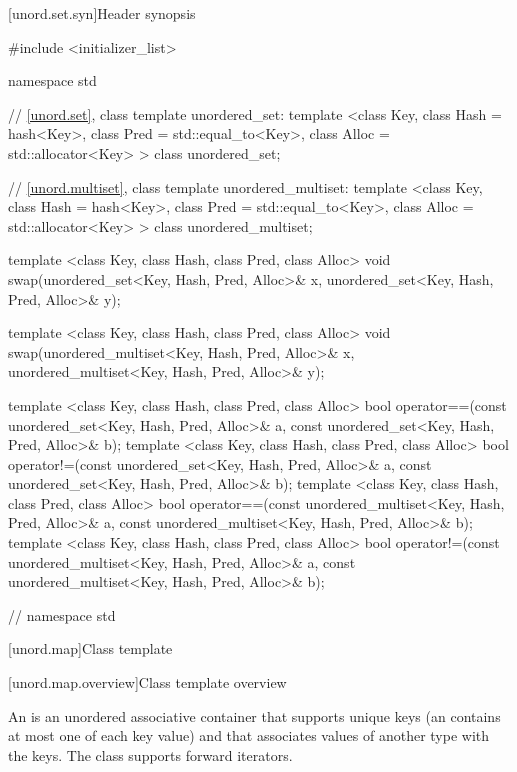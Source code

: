 [unord.set.syn]{Header  synopsis}%
%
%
%
\begin{codeblock}
#include <initializer_list>

namespace std {

  // \ref{unord.set}, class template unordered_set:
  template <class Key,
            class Hash = hash<Key>,
            class Pred = std::equal_to<Key>,
            class Alloc = std::allocator<Key> >
    class unordered_set;

  // \ref{unord.multiset}, class template unordered_multiset:
  template <class Key,
            class Hash = hash<Key>,
            class Pred = std::equal_to<Key>,
            class Alloc = std::allocator<Key> >
    class unordered_multiset;

  template <class Key, class Hash, class Pred, class Alloc>
    void swap(unordered_set<Key, Hash, Pred, Alloc>& x,
              unordered_set<Key, Hash, Pred, Alloc>& y);

  template <class Key, class Hash, class Pred, class Alloc>
    void swap(unordered_multiset<Key, Hash, Pred, Alloc>& x,
              unordered_multiset<Key, Hash, Pred, Alloc>& y);

  template <class Key, class Hash, class Pred, class Alloc>
    bool operator==(const unordered_set<Key, Hash, Pred, Alloc>& a,
                    const unordered_set<Key, Hash, Pred, Alloc>& b);
  template <class Key, class Hash, class Pred, class Alloc>
    bool operator!=(const unordered_set<Key, Hash, Pred, Alloc>& a,
                    const unordered_set<Key, Hash, Pred, Alloc>& b);
  template <class Key, class Hash, class Pred, class Alloc>
    bool operator==(const unordered_multiset<Key, Hash, Pred, Alloc>& a,
                    const unordered_multiset<Key, Hash, Pred, Alloc>& b);
  template <class Key, class Hash, class Pred, class Alloc>
    bool operator!=(const unordered_multiset<Key, Hash, Pred, Alloc>& a,
                    const unordered_multiset<Key, Hash, Pred, Alloc>& b);
} // namespace std
\end{codeblock}

[unord.map]{Class template }%

[unord.map.overview]{Class template  overview}

\pnum
{}%
%
An  is an unordered associative container that
supports unique keys (an  contains at most one of each
key value) and that associates values of another type
 with the keys.
The  class
supports forward iterators.

